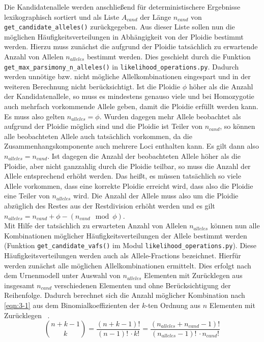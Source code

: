 Die Kandidatenallele werden anschließend für deterministischere Ergebnisse lexikographisch sortiert und als Liste $ A_{cand} $ der Länge $ n_{cand} $ von \lstinline|get_candidate_alleles()| zurückgegeben. Aus dieser Liste sollen nun die möglichen Häufigkeitsverteilungen in Abhängigkeit von der Ploidie bestimmt werden. Hierzu muss zunächst die aufgrund der Ploidie tatsächlich zu erwartende Anzahl von Allelen $n_{alleles}$ bestimmt werden. Dies geschieht durch die Funktion \lstinline|get_max_parsimony_n_alleles()| in \lstinline|likelihood_operations.py|. Dadurch werden unnötige bzw. nicht mögliche Allelkombinationen eingespart und in der weiteren Berechnung nicht berücksichtigt. Ist die Ploidie $ \phi $ höher als die Anzahl der Kandidatenallele, so muss es mindestens genauso viele und bei Homozygotie auch mehrfach vorkommende Allele geben, damit die Ploidie erfüllt werden kann. Es muss also gelten $ n_{alleles} = \phi $. Wurden dagegen mehr Allele beobachtet als aufgrund der Ploidie möglich sind und die Ploidie ist Teiler von $n_{cand}$, so können alle beobachteten Allele auch tatsächlich vorkommen, da die Zusammenhangskomponente auch mehrere Loci enthalten kann. Es gilt dann also $ n_{alleles} = n_{cand} $. Ist dagegen die Anzahl der beobachteten Allele höher als die Ploidie, aber nicht ganzzahlig durch die Ploidie teilbar, so muss die Anzahl der Allele entsprechend erhöht werden. Das heißt, es müssen tatsächlich so viele Allele vorkommen, dass eine korrekte Ploidie erreicht wird, dass also die Ploidie eine Teiler von $ n_{alleles} $ wird. Die Anzahl der Allele muss also um die Ploidie abzüglich des Restes aus der Restdivision erhöht werden und es gilt $ n_{alleles} = n_{cand} + \phi - (n_{cand} \mod \phi)$. \\

Mit Hilfe der tatsächlich zu erwarteten Anzahl von Allelen $ n_{alleles} $ können nun alle Kombinationen möglicher Häufigkeitsverteilungen der Allele bestimmt werden (Funktion \linebreak \lstinline|get_candidate_vafs()| im Modul \lstinline|likelihood_operations.py|). Diese Häufigkeitsverteilungen werden auch als Allele-Fractions bezeichnet. Hierfür werden zunächst alle möglichen Allelkombinationen ermittelt. Dies erfolgt nach dem Urnenmodell unter Auswahl von $ n_{alleles} $ Elementen mit Zurücklegen aus insgesamt $ n_{cand} $ verschiedenen Elementen und ohne Berücksichtigung der Reihenfolge. Dadurch berechnet sich die Anzahl möglicher Kombination nach \eqref{eqn:3-1} aus dem  Binomialkoeffizienten der $k$-ten Ordnung aus $ n $ Elementen mit Zurücklegen ~\cite{tb_stat,bronst}.
\begin{equation} \label{eqn:3-1}
\tag{3-1}
\binom{n + k - 1}{k} = \frac{(n+k-1)!}{(n-1)!\, \cdotp k!} = \frac{(n_{alleles}+n_{cand}-1)!}{(n_{alleles}-1)!\, \cdotp n_{cand}!} 
\end{equation}

